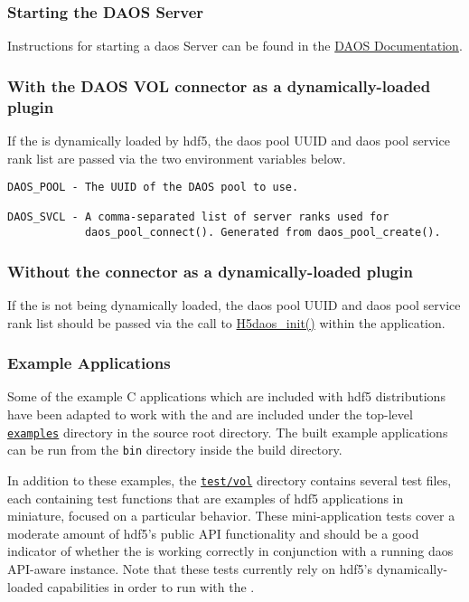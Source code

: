 \documentclass[../users_guide.tex]{subfiles}
\begin{document}
\subsubsection{Starting the DAOS Server}
\label{sec:daos_serv_start}

Instructions for starting a \acrshort{daos} Server can be found in the \href{https://daos-stack.github.io/admin/deployment/#server-startup}{DAOS Documentation}.

\subsubsection{With the DAOS VOL connector as a dynamically-loaded plugin}

If the \dvc{} is dynamically loaded by \acrshort{hdf5}, the \acrshort{daos} pool UUID and
\acrshort{daos} pool service rank list are passed via the two environment variables below.

\begin{verbatim}
DAOS_POOL - The UUID of the DAOS pool to use.

DAOS_SVCL - A comma-separated list of server ranks used for
            daos_pool_connect(). Generated from daos_pool_create().
\end{verbatim}

\subsubsection{Without the connector as a dynamically-loaded plugin}

If the \dvc{} is not being dynamically loaded, the \acrshort{daos} pool UUID
and \acrshort{daos} pool service rank list should be passed via the call to
\hyperref[ref:h5daos_init]{H5daos\_init()} within the application.

\subsubsection{Example Applications}

Some of the example C applications which are included with \acrshort{hdf5} distributions have been adapted to work with the \dvc{} and are included under the top-level \href{https://bitbucket.hdfgroup.org/projects/HDF5VOL/repos/daos-vol/browse/examples}{\texttt{examples}} directory in the \dvc{} source root directory. The built example applications can be run from the \texttt{bin} directory inside the build directory.

In addition to these examples, the \href{https://bitbucket.hdfgroup.org/projects/HDF5VOL/
repos/daos-vol/browse/test}{\texttt{test/vol}} directory contains several test
files, each containing test functions that are examples of \acrshort{hdf5} applications in
miniature, focused on a particular behavior. These mini-application tests cover a moderate 
amount of \acrshort{hdf5}'s public API functionality and should be a good indicator of
whether the \dvc{} is working correctly in conjunction with a
running \acrshort{daos} API-aware instance. Note that these tests currently rely on \acrshort{hdf5}'s
dynamically-loaded \vc{} capabilities in order to run with the \dvc{}.
\end{document}
